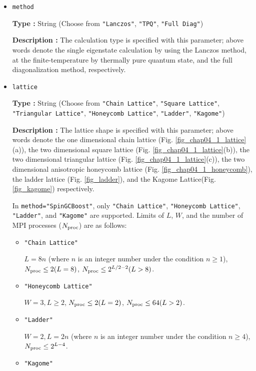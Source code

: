 \begin{itemize}
\item \verb|method|
  
{\bf Type :} String (Choose from \verb|"Lanczos"|, \verb|"TPQ"|, \verb|"Full Diag"|)

{\bf Description :} The calculation type is specified with this parameter;
above words denote 
the single eigenstate calculation by using the Lanczos method,
at the finite-temperature by thermally pure quantum state,
and the full diagonalization method,
respectively.

\item \verb|lattice|

{\bf Type :} String (Choose from \verb|"Chain Lattice"|, \verb|"Square Lattice"|, 
\verb|"Triangular Lattice"|, \verb|"Honeycomb Lattice"|, \verb|"Ladder"|, \verb|"Kagome"|)

{\bf Description :} The lattice shape is specified with this parameter;
above words denote
the one dimensional chain lattice (Fig. \ref{fig_chap04_1_lattice}(a)), 
the two dimensional square lattice (Fig. \ref{fig_chap04_1_lattice}(b)),
the two dimensional triangular lattice (Fig. \ref{fig_chap04_1_lattice}(c)),
the two dimensional anisotropic honeycomb lattice (Fig. \ref{fig_chap04_1_honeycomb}),
the ladder lattice (Fig. \ref{fig_ladder}),
and
the Kagome Lattice(Fig. \ref{fig_kagome})
respectively.

In \verb|method="SpinGCBoost"|,
only \verb|"Chain Lattice"|, \verb|"Honeycomb Lattice"|, 
\verb|"Ladder"|, and \verb|"Kagome"| are supported.
Limits of $L$, $W$, and the number of MPI processes ($N_{\rm proc}$) are as follows:

\begin{itemize}

  \item \verb|"Chain Lattice"|

    $L = 8n$ (where $n$ is an integer number under the condition  $n\geq1$),
    $N_{\rm proc} \leq 2(L=8)$, $N_{\rm proc} \leq 2^{L/2-2}(L>8)$.
    
  \item \verb|"Honeycomb Lattice"|

    $W=3, L \geq 2$, $N_{\rm proc} \leq 2(L=2)$, $N_{\rm proc} \leq 64(L>2)$.

  \item \verb|"Ladder"|

    $W=2, L = 2n$ (where $n$ is an integer number under the condition  $n\geq4$),
    $N_{\rm proc} \leq 2^{L-4}$.

  \item \verb|"Kagome"|


\end{itemize}
\end{itemize}
